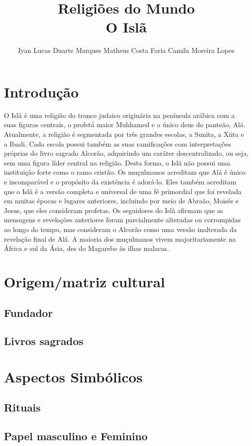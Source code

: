 \documentclass[12pt]{article}
\title{Religiões do Mundo\\O Islã}
\author{Iyan Lucas Duarte Marques\inst{1}
Matheus Costa Faria\inst{1}
Camila Moreira Lopes\inst{1}}
\begin{document}
\maketitle
\section{Introdução}
O Islã é uma religião do tronco judaico originária na península arábica com a suas figuras centrais, o profetá maior Muhhamed e o único deus do panteão, Alá.
Atualmente, a religião é segmentada por três grandes escolas, a Sunita, a Xiita e a Ibadi. 
Cada escola possui também as suas ramificações com interpretações próprias do livro sagrado Alcorão, adquirindo um caráter descentralizado, ou seja, sem uma figura líder central na religião.
Desta forma, o Islã não possui uma instituição forte como o ramo cristão.
Os muçulmanos acreditam que Alá é único e incomparável e o propósito da existência é adorá-lo.
Eles também acreditam que o Islã é a versão completa e universal de uma fé primordial que foi revelada em muitas épocas e lugares anteriores, incluindo por meio de Abraão, Moisés e Jesus, que eles consideram profetas.
Os seguidores do Islã afirmam que as mensagens e revelações anteriores foram parcialmente alteradas ou corrompidas ao longo do tempo, mas consideram o Alcorão como uma versão inalterada da revelação final de Alá.
A maioria dos muçulmanos vivem majoritariamente na África e sul da Ásia, des do Magarebe às ilhas malacas.
\section{Origem/matriz cultural}

\subsection{Fundador}
\subsection{Livros sagrados}
\section{Aspectos Simbólicos}
\subsection{Rituais}
\subsection{Papel masculino e Feminino}
\end{document}
